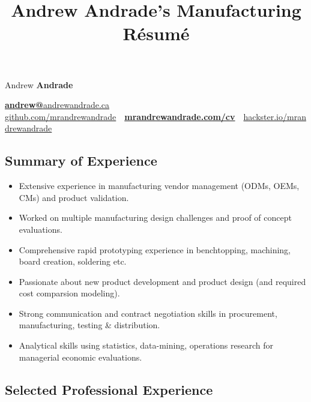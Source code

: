 \documentclass[pdftex,11pt,letterpaper]{article}
\title{Andrew Andrade's Manufacturing Résumé}
\begin{document}
\font

\begin{center}
  {\Huge Andrew \textbf{Andrade}}

  {\large
    \href{mailto:andrew@andrewandrade.ca}{\textbf{andrew@}}\href{http://andrewandrade.ca}{andrewandrade.ca} \\ 

    \href{https://github.com/mrandrewandrade}{github.com/mrandrewandrade}\ \textperiodcentered \ \href{http://mrandrewandrade.com/cv}{\textbf{mrandrewandrade.com/cv}}\ \textperiodcentered \ \href{https://www.hackster.io/mrandrewandrade}{hackster.io/mrandrewandrade}
  }
\end{center}

\subsection*{Summary of Experience}

\begin{itemize}[before=,after=]

\item Extensive experience in manufacturing vendor management (ODMs, OEMs, CMs) and product validation.
  
\item Worked on multiple manufacturing design challenges and proof of concept evaluations.

\item Comprehensive rapid prototyping experience in benchtopping, machining, board creation, soldering etc.

\item Passionate about new product development and product design (and required cost comparsion modeling).

\item Strong communication and contract negotiation skills in procurement, manufacturing, testing \& distribution.

\item Analytical skills using statistics, data-mining, operations research for managerial economic evaluations.

\end{itemize}

\subsection*{Selected Professional Experience}
\end{document}
